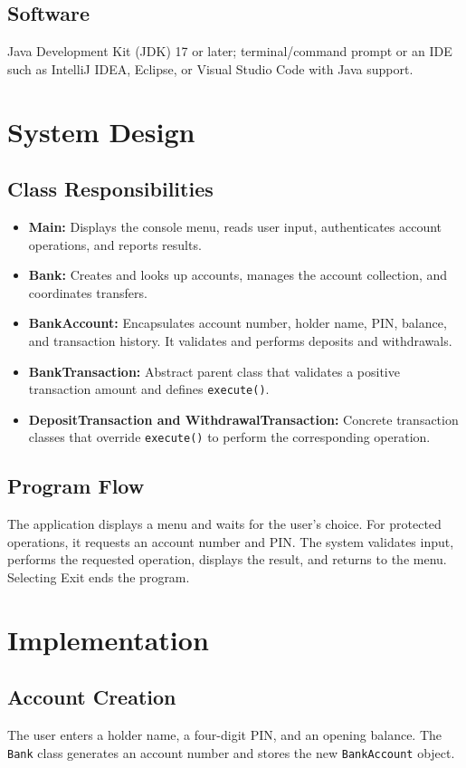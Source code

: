 \documentclass[11pt,a4paper]{report}
\begin{document}
\subsection{Software}
Java Development Kit (JDK) 17 or later; terminal/command prompt or an IDE such as IntelliJ IDEA, Eclipse, or Visual Studio Code with Java support.

\section{System Design}
\subsection{Class Responsibilities}
\begin{itemize}
\item \textbf{Main:} Displays the console menu, reads user input, authenticates account operations, and reports results.
\item \textbf{Bank:} Creates and looks up accounts, manages the account collection, and coordinates transfers.
\item \textbf{BankAccount:} Encapsulates account number, holder name, PIN, balance, and transaction history. It validates and performs deposits and withdrawals.
\item \textbf{BankTransaction:} Abstract parent class that validates a positive transaction amount and defines \texttt{execute()}.
\item \textbf{DepositTransaction and WithdrawalTransaction:} Concrete transaction classes that override \texttt{execute()} to perform the corresponding operation.
\end{itemize}

\subsection{Program Flow}
The application displays a menu and waits for the user's choice. For protected operations, it requests an account number and PIN. The system validates input, performs the requested operation, displays the result, and returns to the menu. Selecting Exit ends the program.

\section{Implementation}
\subsection{Account Creation}
The user enters a holder name, a four-digit PIN, and an opening balance. The \texttt{Bank} class generates an account number and stores the new \texttt{BankAccount} object.
\end{document}
